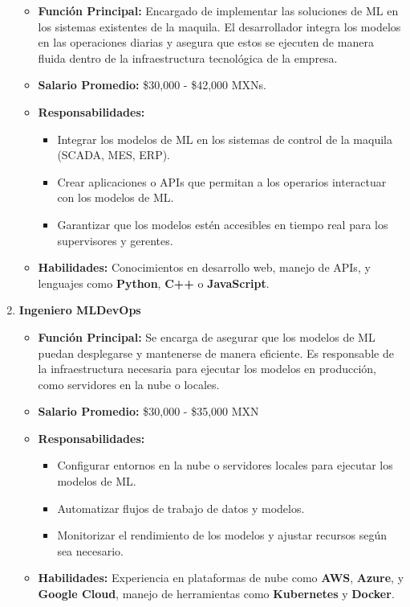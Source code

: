 \documentclass[
  10pt,
  letterpaper,
]{book}
\providecommand{\tightlist}{%
  \setlength{\itemsep}{0pt}\setlength{\parskip}{0pt}}\usepackage{longtable,booktabs,array}
\begin{document}
\begin{enumerate}
  \begin{itemize}
  \tightlist
  \item
    \textbf{Función Principal:} Encargado de implementar las soluciones
    de ML en los sistemas existentes de la maquila. El desarrollador
    integra los modelos en las operaciones diarias y asegura que estos
    se ejecuten de manera fluida dentro de la infraestructura
    tecnológica de la empresa.
  \item
    \textbf{Salario Promedio:} \$30,000 - \$42,000 MXNs.
  \item
    \textbf{Responsabilidades:}

    \begin{itemize}
    \tightlist
    \item
      Integrar los modelos de ML en los sistemas de control de la
      maquila (SCADA, MES, ERP).
    \item
      Crear aplicaciones o APIs que permitan a los operarios interactuar
      con los modelos de ML.
    \item
      Garantizar que los modelos estén accesibles en tiempo real para
      los supervisores y gerentes.
    \end{itemize}
  \item
    \textbf{Habilidades:} Conocimientos en desarrollo web, manejo de
    APIs, y lenguajes como \textbf{Python}, \textbf{C++} o
    \textbf{JavaScript}.
  \end{itemize}
\item
  \textbf{Ingeniero MLDevOps}

  \begin{itemize}
  \tightlist
  \item
    \textbf{Función Principal:} Se encarga de asegurar que los modelos
    de ML puedan desplegarse y mantenerse de manera eficiente. Es
    responsable de la infraestructura necesaria para ejecutar los
    modelos en producción, como servidores en la nube o locales.
  \item
    \textbf{Salario Promedio:} \$30,000 - \$35,000 MXN
  \item
    \textbf{Responsabilidades:}

    \begin{itemize}
    \tightlist
    \item
      Configurar entornos en la nube o servidores locales para ejecutar
      los modelos de ML.
    \item
      Automatizar flujos de trabajo de datos y modelos.
    \item
      Monitorizar el rendimiento de los modelos y ajustar recursos según
      sea necesario.
    \end{itemize}
  \item
    \textbf{Habilidades:} Experiencia en plataformas de nube como
    \textbf{AWS}, \textbf{Azure}, y \textbf{Google Cloud}, manejo de
    herramientas como \textbf{Kubernetes} y \textbf{Docker}.
  \end{itemize}
\end{enumerate}
\end{document}
